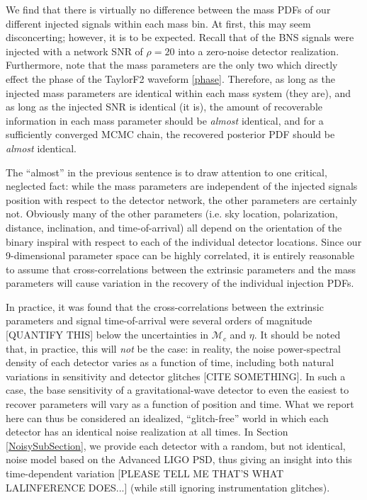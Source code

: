 \documentclass{emulateapj}
\newcommand{\carl}[1]{{\color{red}  #1}}
\begin{document}
We find that there is virtually no difference between the mass PDFs of our different injected signals within each mass bin.  At first, this may seem disconcerting; however, it is to be expected.  Recall that of the BNS signals were injected with a network SNR of $\rho = 20$ into a zero-noise detector realization.  Furthermore, note that the mass parameters are the only two which directly effect the phase of the TaylorF2 waveform \eqref{phase}.  Therefore, as long as the injected mass parameters are identical within each mass system (they are), and as long as the injected SNR is identical (it is), the amount of recoverable information in each mass parameter should be \emph{almost} identical, and for a sufficiently converged MCMC chain, the recovered posterior PDF should be \emph{almost} identical.  

The ``almost'' in the previous sentence is to draw attention to one critical, neglected fact: while the mass parameters are independent of the injected signals position with respect to the detector network, the other parameters are certainly not.  Obviously many of the other parameters (i.e. sky location, polarization, distance, inclination, and time-of-arrival) all depend on the orientation of the binary inspiral with respect to each of the individual detector locations.  Since our 9-dimensional parameter space can be highly correlated, it is entirely reasonable to assume that cross-correlations between the extrinsic parameters and the mass parameters will cause variation in the recovery of the individual injection PDFs.  

In practice, it was found that the cross-correlations between the extrinsic parameters and signal time-of-arrival were several orders of magnitude \carl{[QUANTIFY THIS]} below the uncertainties in $\mathcal{M}_c$ and $\eta$.  It should be noted that, in practice, this will \emph{not} be the case: in reality, the noise power-spectral density of each detector varies as a function of time, including both natural variations in sensitivity and detector glitches \carl{[CITE SOMETHING]}.  In such a case, the base sensitivity of a gravitational-wave detector to even the easiest to recover parameters will vary as a function of position and time.  What we report here can thus be considered an idealized, ``glitch-free'' world in which each detector has an identical noise realization at all times.  In Section \ref{NoisySubSection}, we provide each detector with a random, but not identical, noise model based on the Advanced LIGO PSD, thus giving an insight into this time-dependent variation \carl{[PLEASE TELL ME THAT'S WHAT LALINFERENCE DOES...]} (while still ignoring instrumentation glitches).
\end{document}
